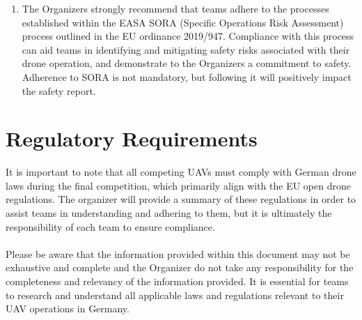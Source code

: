 \documentclass{article}
\begin{document}
\begin{enumerate}
  \item The Organizers strongly recommend that teams adhere to the processes established within the EASA SORA (Specific Operations Risk Assessment) process outlined in the EU ordinance 2019/947. Compliance with this process can aid teams in identifying and mitigating safety risks associated with their drone operation, and demonstrate to the Organizers a commitment to safety. Adherence to SORA is not mandatory, but following it will positively impact the safety report.
\end{enumerate}


\section{Regulatory Requirements}
It is important to note that all competing UAVs must comply with German drone laws during the final competition, which primarily align with the EU open drone regulations. The organizer will provide a summary of these regulations in order to assist teams in understanding and adhering to them, but it is ultimately the responsibility of each team to ensure compliance. \\ \\
Please be aware that the information provided within this document may not be exhaustive and complete and the Organizer do not take any responsibility for the completeness and relevancy of the information provided. It is essential for teams to research and understand all applicable laws and regulations relevant to their UAV operations in Germany.
\end{document}
